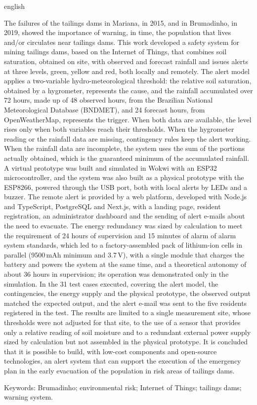 \begin{resumo}[Abstract]
\begin{otherlanguage*}{english}
\begin{SingleSpace}
\setlength{\parindent}{1.3cm}
The failures of the tailings dams in Mariana, in 2015, and in
Brumadinho, in 2019, showed the importance of warning, in time, the
population that lives and/or circulates near tailings dams. This work
developed a safety system for mining tailings dams, based on the
Internet of Things, that combines soil saturation, obtained on site,
with observed and forecast rainfall and issues alerts at three levels,
green, yellow and red, both locally and remotely. The alert model
applies a two-variable hydro-meteorological threshold: the relative
soil saturation, obtained by a hygrometer, represents the cause, and
the rainfall accumulated over 72 hours, made up of 48 observed hours,
from the Brazilian National Meteorological Database (BNDMET), and 24
forecast hours, from OpenWeatherMap, represents the trigger. When both
data are available, the level rises only when both variables reach
their thresholds. When the hygrometer reading or the rainfall data are
missing, contingency rules keep the alert working. When the rainfall
data are incomplete, the system uses the sum of the portions actually
obtained, which is the guaranteed minimum of the accumulated rainfall.
A virtual prototype was built and simulated in Wokwi with an ESP32
microcontroller, and the system was also built as a physical prototype
with the ESP8266, powered through the USB port, both with local alerts
by LEDs and a buzzer. The remote alert is provided by a web platform,
developed with Node.js and TypeScript, PostgreSQL and Next.js, with a
landing page, resident registration, an administrator dashboard and the
sending of alert e-mails about the need to evacuate. The energy
redundancy was sized by calculation to meet the requirement of 24 hours
of supervision and 15 minutes of alarm of alarm system standards, which
led to a factory-assembled pack of lithium-ion cells in parallel
(9500\,mAh minimum and 3.7\,V), with a single module that charges the
battery and powers the system at the same time, and a theoretical
autonomy of about 36 hours in supervision; its
operation was demonstrated only in the simulation. In the 31 test cases
executed, covering the alert model, the contingencies, the energy
supply and the physical prototype, the observed output matched the
expected output, and the alert e-mail was sent to the five residents
registered in the test. The results are limited to a single measurement
site, whose thresholds were not adjusted for that site, to the use of a
sensor that provides only a relative reading of soil moisture and to a
redundant external power supply sized by calculation but not assembled in the
physical prototype. It is concluded that it is possible to build, with
low-cost components and open-source technologies, an alert system that
can support the execution of the emergency plan in the early evacuation of
the population in risk areas of tailings dams.

\vspace{\onelineskip}
\noindent Keywords: Brumadinho; environmental risk; Internet of Things; tailings dams; warning system.

\end{SingleSpace}
\end{otherlanguage*}
\end{resumo}
